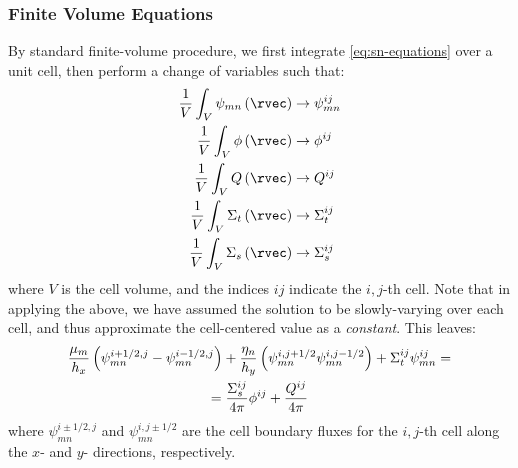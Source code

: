 \begin{frame}[allowframebreaks]
  \frametitle{Finite Volume Equations}
  By standard finite-volume procedure, we first integrate \cref{eq:sn-equations} over a unit cell, then perform a change of variables such that:
  \begin{align}
    \frac{1}{V}\int_{V}\psi_{mn}\left(\rvec\right) & \rightarrow \psi_{mn}^{ij} \\
    \frac{1}{V}\int_{V}\phi\left(\rvec\right)      & \rightarrow \phi^{ij}      \\
    \frac{1}{V}\int_{V}Q\left(\rvec\right)         & \rightarrow Q^{ij}         \\
    \frac{1}{V}\int_{V}\Sigma_t\left(\rvec\right)  & \rightarrow \Sigma_t^{ij}  \\
    \frac{1}{V}\int_{V}\Sigma_s\left(\rvec\right)  & \rightarrow \Sigma_s^{ij}
  \end{align}
  where $V$ is the cell volume, and the indices $ij$ indicate the $i,j$-th cell.
  Note that in applying the above, we have assumed the solution to be slowly-varying over each cell, and thus approximate the cell-centered value as a \textit{constant}.
  This leaves:
  \begin{multline}\label{eq:fv-eqs}
    \frac{\mu_{m}}{h_x}\left(\psi_{mn}^{i+1/2,j}-\psi_{mn}^{i-1/2,j}\right)+\frac{\eta_{n}}{h_y}\left(\psi_{mn}^{i,j+1/2}\-\psi_{mn}^{i,j-1/2}\right) + \Sigma_t ^{ij}\psi_{mn}^{ij} =\\=\frac{\Sigma_s^{ij}}{4\pi}\phi^{ij} + \frac{Q^{ij}}{4\pi}
  \end{multline}
  where $\psi_{mn}^{i\pm1/2,j}$ and $\psi_{mn}^{i,j\pm1/2}$ are the cell boundary fluxes for the $i,j$-th cell along the $x$- and $y$- directions, respectively.
\end{frame}